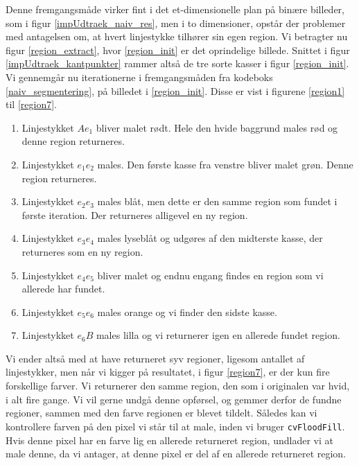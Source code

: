 {Denne fremgangsmåde virker fint i det et-dimensionelle plan på binære
billeder, som i figur \ref{impUdtraek_naiv_res}, men i to dimensioner,
opstår der problemer med antagelsen om, at hvert linjestykke tilhører
sin egen region. Vi betragter nu figur \ref{region_extract}, hvor
\ref{region_init} er det oprindelige billede.  Snittet i figur
\ref{impUdtraek_kantpunkter} rammer altså de tre sorte kasser i figur
\ref{region_init}. Vi gennemgår nu iterationerne i fremgangsmåden fra
kodeboks \ref{naiv_segmentering}, på billedet i \ref{region_init}.
Disse er vist i figurene \ref{region1} til \ref{region7}.

\begin{enumerate}
    \item Linjestykket $Ae_1$ bliver malet rødt. Hele den hvide baggrund
        males rød og denne region returneres.
    \item Linjestykket $e_1e_2$ males. Den første kasse fra venstre
        bliver malet grøn. Denne region returneres.
    \item Linjestykket $e_2e_3$ males blåt, men dette er den samme region som
        fundet i første iteration. Der returneres alligevel en ny
        region.
    \item Linjestykket $e_3e_4$ males lyseblåt og udgøres af den
        midterste kasse, der returneres som en ny region.
    \item Linjestykket $e_4e_5$ bliver malet og endnu engang findes en
        region som vi allerede har fundet.
    \item Linjestykket $e_5e_6$ males orange og vi finder den sidste
        kasse.
    \item Linjestykket $e_6B$ males lilla og vi returnerer igen en
        allerede fundet region.
\end{enumerate}
Vi ender altså med at have returneret syv regioner, ligesom antallet af
linjestykker, men når vi kigger på resultatet, i figur \ref{region7}, er
der kun fire forskellige farver. Vi returnerer den samme region, den som
i originalen var hvid, i alt fire gange. Vi vil gerne undgå denne
opførsel, og gemmer derfor de fundne regioner, sammen med den farve
regionen er blevet tildelt. Således kan vi kontrollere farven på den
pixel vi står til at male, inden vi bruger \texttt{cvFloodFill}. Hvis
denne pixel har en farve lig en allerede returneret region, undlader vi
at male denne, da vi antager, at denne pixel er del af en allerede
returneret region.

}
